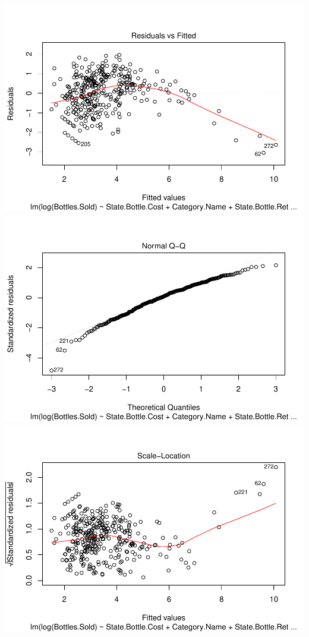 \documentclass[]{elsarticle} %
\makeatletter
\def\maxwidth{\ifdim\Gin@nat@width>\linewidth\linewidth
\else\Gin@nat@width\fi}
\let\Oldincludegraphics\includegraphics
\renewcommand{\includegraphics}[1]{\Oldincludegraphics[width=\maxwidth]{#1}}
\makeatother
\begin{document}
\includegraphics{Final_Project_files/figure-latex/unnamed-chunk-14-3.pdf}
\includegraphics{Final_Project_files/figure-latex/unnamed-chunk-14-4.pdf}
\includegraphics{Final_Project_files/figure-latex/unnamed-chunk-14-5.pdf}
\end{document}
